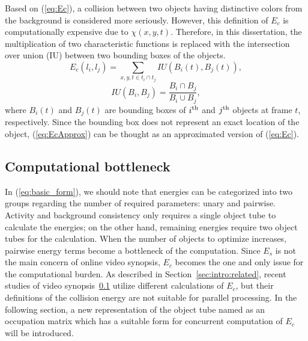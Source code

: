 \documentclass[11pt]{hyu_thesis}
\begin{document}
Based on (\ref{eq:Ec}), a collision between two objects having distinctive colors from the background is considered more seriously. However, this definition of $E_c$ is computationally expensive due to $\chi(x,y,t)$. Therefore, in this dissertation, the multiplication of two characteristic functions is replaced with the intersection over union (IU) between two bounding boxes of the objects.
\begin{equation}
\label{eq:EcApprox}
E_c(l_i,l_j)=\sum_{x,y,t \in t_i \cap t_j} IU \left( B_i(t),B_j(t) \right),
\end{equation}
\begin{equation}
IU(B_i,B_j)=\frac{B_i \cap B_j}{B_i \cup B_j},
\end{equation}
where $B_i(t)$ and $B_j(t)$ are bounding boxes of $i^{\rm{th}}$ and $j^{\rm{th}}$ objects at frame $t$, respectively. Since the bounding box does not represent an exact location of the object, (\ref{eq:EcApprox}) can be thought as an approximated version of (\ref{eq:Ec}).

\subsection{Computational bottleneck}
In (\ref{eq:basic_form}), we should note that energies can be categorized into two groups regarding the number of required parameters: unary and pairwise. Activity and background consistency only requires a single object tube to calculate the energies; on the other hand, remaining energies require two object tubes for the calculation. When the number of objects to optimize increases, pairwise energy terms become a bottleneck of the computation. Since $E_s$ is not the main concern of online video synopsis, $E_c$ becomes the one and only issue for the computational burden. As described in Section~\ref{sec:intro:related}, recent studies of video synopsis~\ref{} utilize different calculations of $E_c$, but their definitions of the collision energy are not suitable for parallel processing. In the following section, a new representation of the object tube named as an occupation matrix which has a suitable form for concurrent computation of $E_c$ will be introduced.
\end{document}
